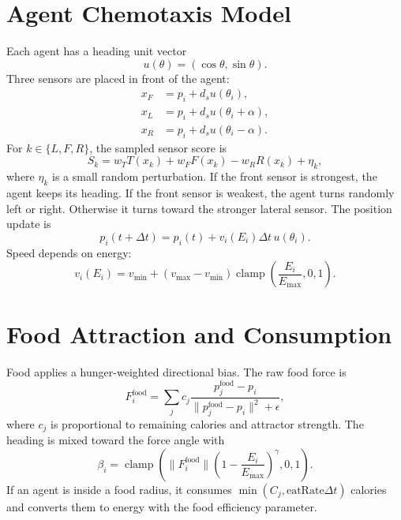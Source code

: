 \documentclass[11pt]{article}
\begin{document}
\section{Agent Chemotaxis Model}
Each agent has a heading unit vector
\begin{equation}
\label{eq:heading}
u(\theta) = (\cos \theta, \sin \theta).
\end{equation}
Three sensors are placed in front of the agent:
\begin{align}
\label{eq:sensors}
x_F &= p_i + d_s u(\theta_i),\\
x_L &= p_i + d_s u(\theta_i + \alpha),\\
x_R &= p_i + d_s u(\theta_i - \alpha).
\end{align}
For $k \in \{L,F,R\}$, the sampled sensor score is
\begin{equation}
\label{eq:sensor-score}
S_k = w_T T(x_k) + w_F F(x_k) - w_R R(x_k) + \eta_k,
\end{equation}
where $\eta_k$ is a small random perturbation. If the front sensor is strongest,
the agent keeps its heading. If the front sensor is weakest, the agent turns
randomly left or right. Otherwise it turns toward the stronger lateral sensor.
The position update is
\begin{equation}
\label{eq:position-update}
p_i(t + \Delta t) = p_i(t) + v_i(E_i)\Delta t\,u(\theta_i).
\end{equation}
Speed depends on energy:
\begin{equation}
\label{eq:energy-speed}
v_i(E_i) = v_{\min} + (v_{\max} - v_{\min})
\operatorname{clamp}\left(\frac{E_i}{E_{\max}},0,1\right).
\end{equation}

\section{Food Attraction and Consumption}
Food applies a hunger-weighted directional bias. The raw food force is
\begin{equation}
\label{eq:food-force}
F^{\mathrm{food}}_i =
\sum_j c_j \frac{p^{\mathrm{food}}_j - p_i}
{\lVert p^{\mathrm{food}}_j - p_i \rVert^2 + \epsilon},
\end{equation}
where $c_j$ is proportional to remaining calories and attractor strength.
The heading is mixed toward the force angle with
\begin{equation}
\label{eq:food-beta}
\beta_i =
\operatorname{clamp}\left(
\lVert F^{\mathrm{food}}_i \rVert
\left(1 - \frac{E_i}{E_{\max}}\right)^\gamma,0,1
\right).
\end{equation}
If an agent is inside a food radius, it consumes
$\min(C_j,\mathrm{eatRate}\Delta t)$ calories and converts them to energy with
the food efficiency parameter.
\end{document}
